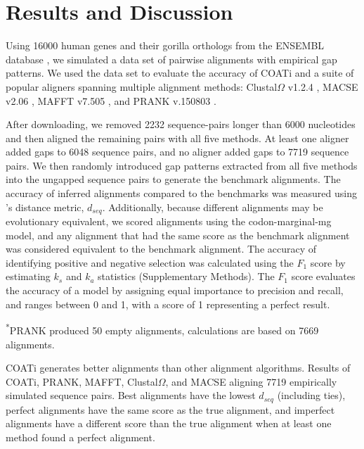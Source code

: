 \section*{Results and Discussion}
Using 16000 human genes and their gorilla orthologs from the ENSEMBL
database , we simulated a data set of pairwise
alignments with empirical gap patterns.
We used the data set to evaluate the accuracy of COATi and a suite of popular aligners spanning multiple alignment methods:
Clustal$\Omega$ v1.2.4 ,
MACSE v2.06 , MAFFT v7.505
, and PRANK v.150803 .

After downloading, we removed 2232 sequence-pairs longer than 6000 nucleotides and then aligned the remaining pairs with all five methods.
At least one aligner added gaps to 6048 sequence pairs, and no aligner added gaps to 7719 sequence pairs.
We then randomly introduced gap patterns extracted from all five methods into the ungapped sequence pairs to generate the benchmark alignments.
The accuracy of inferred alignments compared to the benchmarks was measured using \citeauthor{metrics_blackburne_whelan_2011}'s \citeyearpar{metrics_blackburne_whelan_2011} distance metric, $d_{seq}$.
Additionally, because different alignments may be evolutionary equivalent, we scored alignments using the codon-marginal-mg model, and any alignment that had the same score as the benchmark alignment was considered equivalent to the benchmark alignment.
The accuracy of identifying positive and negative selection was calculated using the $F_1$ score by estimating $k_s$ and $k_a$ statistics
 (Supplementary Methods).
The $F_1$ score evaluates the accuracy of a model by assigning equal importance to precision and recall, and ranges between 0 and 1, with a score of 1 representing a perfect result.

\begin{table}[!ht]
\centering

 \vspace{1mm}
 \footnotesize{\textsuperscript{*}PRANK produced 50 empty alignments, calculations are based on 7669 alignments.}
 \caption{COATi generates better alignments than other alignment algorithms. Results of COATi, PRANK, MAFFT, Clustal$\Omega$, and MACSE aligning 7719 empirically simulated sequence pairs. Best alignments have the lowest $d_{seq}$ (including ties), perfect alignments have the same score as the true alignment, and imperfect alignments have a different score than the true alignment when at least one method found a perfect alignment.}
 \label{table:comp}
\end{table}

